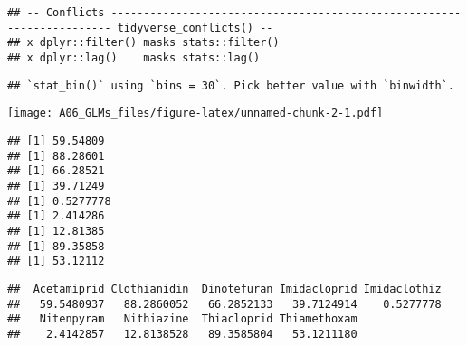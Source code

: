 \documentclass[]{article}
\newenvironment{Shaded}{\begin{snugshade}}{\end{snugshade}}
\newcommand{\KeywordTok}[1]{\textcolor[rgb]{0.13,0.29,0.53}{\textbf{#1}}}
\newcommand{\DataTypeTok}[1]{\textcolor[rgb]{0.13,0.29,0.53}{#1}}
\newcommand{\StringTok}[1]{\textcolor[rgb]{0.31,0.60,0.02}{#1}}
\newcommand{\CommentTok}[1]{\textcolor[rgb]{0.56,0.35,0.01}{\textit{#1}}}
\newcommand{\ControlFlowTok}[1]{\textcolor[rgb]{0.13,0.29,0.53}{\textbf{#1}}}
\newcommand{\OperatorTok}[1]{\textcolor[rgb]{0.81,0.36,0.00}{\textbf{#1}}}
\newcommand{\NormalTok}[1]{#1}
\begin{document}
\begin{verbatim}
## -- Conflicts ---------------------------------------------------------------------- tidyverse_conflicts() --
## x dplyr::filter() masks stats::filter()
## x dplyr::lag()    masks stats::lag()
\end{verbatim}

\begin{Shaded}
\end{Shaded}

\begin{verbatim}
## `stat_bin()` using `bins = 30`. Pick better value with `binwidth`.
\end{verbatim}

\texttt{[image: A06\_GLMs\_files/figure-latex/unnamed-chunk-2-1.pdf]}

\begin{Shaded}
\end{Shaded}

\begin{verbatim}
## [1] 59.54809
## [1] 88.28601
## [1] 66.28521
## [1] 39.71249
## [1] 0.5277778
## [1] 2.414286
## [1] 12.81385
## [1] 89.35858
## [1] 53.12112
\end{verbatim}

\begin{verbatim}
##  Acetamiprid Clothianidin  Dinotefuran Imidacloprid Imidaclothiz 
##   59.5480937   88.2860052   66.2852133   39.7124914    0.5277778 
##   Nitenpyram   Nithiazine  Thiacloprid Thiamethoxam 
##    2.4142857   12.8138528   89.3585804   53.1211180
\end{verbatim}
\end{document}
